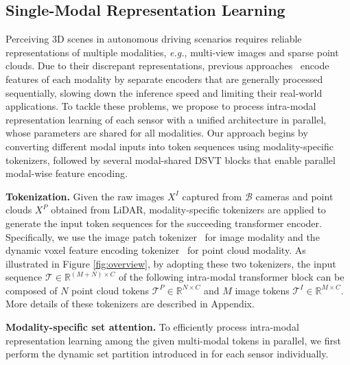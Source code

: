 \documentclass[10pt,twocolumn,letterpaper]{article}
\begin{document}
\subsection{Single-Modal Representation Learning} \label{sec:single-modal}
Perceiving 3D scenes in autonomous driving scenarios requires reliable representations of multiple modalities, \emph{e.g.}, multi-view images and sparse point clouds. Due to their discrepant representations, previous approaches~\cite{li2022unifying,chen2022futr3d,liu2022bevfusion,liang2022bevfusion} encode features of each modality by separate encoders that are generally processed sequentially, slowing down the inference speed and limiting their real-world applications. To tackle these problems, we propose to process intra-modal representation learning of each sensor with a unified architecture in parallel, whose parameters are shared for all modalities. Our approach begins by converting different modal inputs into token sequences using modality-specific tokenizers, followed by several modal-shared DSVT blocks that enable parallel modal-wise feature encoding. 

\noindent \textbf{Tokenization.} Given the raw images $X^I$ captured from $\mathcal{B}$ cameras and point clouds $X^P$ obtained from LiDAR, modality-specific tokenizers are applied to generate the input token sequences for the succeeding transformer encoder. Specifically, we use the image patch tokenizer~\cite{dosovitskiy2020image} for image modality and the dynamic voxel feature encoding tokenizer~\cite{zhou2020end} for point cloud modality. As illustrated in Figure \ref{fig:overview}, by adopting these two tokenizers, the input sequence $\mathcal{T} \in \mathbb{R}^{(M+N) \times C}$ of the following intra-modal transformer block can be composed of $N$ point cloud tokens $\mathcal{T}^P \in \mathbb{R}^{N \times C}$ and $M$ image tokens $\mathcal{T}^I \in \mathbb{R}^{M \times C}$. More details of these tokenizers are described in Appendix. 

\noindent \textbf{Modality-specific set attention.} To efficiently process intra-modal representation learning among the given multi-modal tokens in parallel, we first perform the dynamic set partition introduced in \cite{wang2023dsvt} for each sensor individually.
\end{document}
